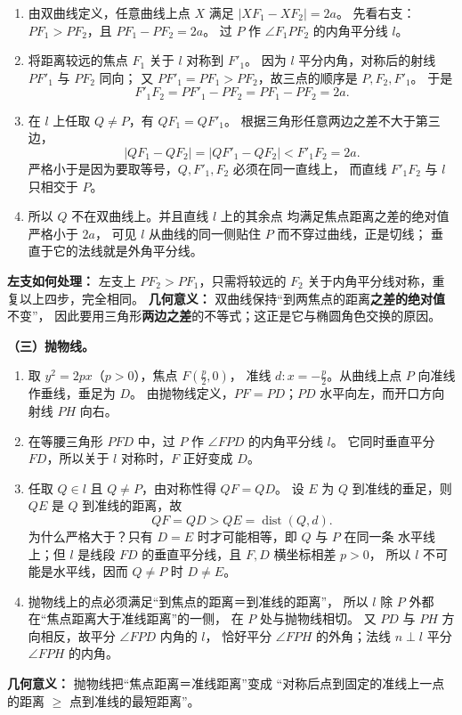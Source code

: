 \begin{proofbox}
\begin{enumerate}
\item 由双曲线定义，任意曲线上点 $X$ 满足
$|XF_1-XF_2|=2a$。
先看右支：$PF_1>PF_2$，且 $PF_1-PF_2=2a$。
过 $P$ 作 $\angle F_1PF_2$ 的内角平分线 $l$。
\item 将距离较远的焦点 $F_1$ 关于 $l$ 对称到 $F'_1$。
因为 $l$ 平分内角，对称后的射线 $PF'_1$ 与 $PF_2$ 同向；
又 $PF'_1=PF_1>PF_2$，故三点的顺序是 $P,F_2,F'_1$。
于是
\[
F'_1F_2=PF'_1-PF_2=PF_1-PF_2=2a.
\]
\item 在 $l$ 上任取 $Q\ne P$，有 $QF_1=QF'_1$。
根据三角形任意两边之差不大于第三边，
\[
|QF_1-QF_2|=|QF'_1-QF_2|<F'_1F_2=2a.
\]
严格小于是因为要取等号，$Q,F'_1,F_2$ 必须在同一直线上，
而直线 $F'_1F_2$ 与 $l$ 只相交于 $P$。
\item 所以 $Q$ 不在双曲线上。并且直线 $l$ 上的其余点
均满足焦点距离之差的绝对值严格小于 $2a$，
可见 $l$ 从曲线的同一侧贴住 $P$ 而不穿过曲线，正是切线；
垂直于它的法线就是外角平分线。
\end{enumerate}
\textbf{左支如何处理：} 左支上 $PF_2>PF_1$，只需将较远的 $F_2$
关于内角平分线对称，重复以上四步，完全相同。
\textbf{几何意义：} 双曲线保持“到两焦点的距离\textbf{之差的绝对值}不变”，
因此要用三角形\textbf{两边之差}的不等式；这正是它与椭圆角色交换的原因。

\par\medskip\begin{minipage}{\linewidth}
\textbf{（三）抛物线。}
\begin{center}\end{center}
\end{minipage}\par

\begin{enumerate}
\item 取 $y^2=2px$（$p>0$），焦点 $F(\tfrac p2,0)$，
准线 $d:x=-\tfrac p2$。从曲线上点 $P$ 向准线作垂线，垂足为 $D$。
由抛物线定义，$PF=PD$；$PD$ 水平向左，而开口方向射线 $PH$ 向右。
\item 在等腰三角形 $PFD$ 中，过 $P$ 作 $\angle FPD$ 的内角平分线 $l$。
它同时垂直平分 $FD$，所以关于 $l$ 对称时，$F$ 正好变成 $D$。
\item 任取 $Q\in l$ 且 $Q\ne P$，由对称性得 $QF=QD$。
设 $E$ 为 $Q$ 到准线的垂足，则 $QE$ 是 $Q$ 到准线的距离，故
\[
QF=QD>QE=\operatorname{dist}(Q,d).
\]
为什么严格大于？只有 $D=E$ 时才可能相等，即 $Q$ 与 $P$ 在同一条
水平线上；但 $l$ 是线段 $FD$ 的垂直平分线，且 $F,D$ 横坐标相差 $p>0$，
所以 $l$ 不可能是水平线，因而 $Q\ne P$ 时 $D\ne E$。
\item 抛物线上的点必须满足“到焦点的距离＝到准线的距离”，
所以 $l$ 除 $P$ 外都在“焦点距离大于准线距离”的一侧，
在 $P$ 处与抛物线相切。
又 $PD$ 与 $PH$ 方向相反，故平分 $\angle FPD$ 内角的 $l$，
恰好平分 $\angle FPH$ 的外角；法线 $n\perp l$ 平分 $\angle FPH$ 的内角。
\end{enumerate}
\textbf{几何意义：} 抛物线把“焦点距离＝准线距离”变成
“对称后点到固定的准线上一点的距离 $\ge$ 点到准线的最短距离”。

\medskip\noindent
\end{proofbox}
